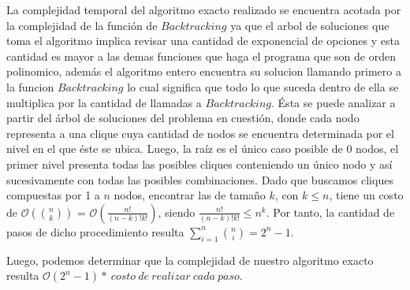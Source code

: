 La complejidad temporal del algoritmo exacto realizado se encuentra acotada por la complejidad de la función de $Backtracking$ ya que el arbol de soluciones que toma el algoritmo implica revisar una cantidad de exponencial de opciones y esta cantidad es mayor a las demas funciones que haga el programa que son de orden polinomico, además el algoritmo entero encuentra su solucion llamando primero a la funcion $Backtracking$ lo cual significa que todo lo que suceda dentro de ella se multiplica por la cantidad de llamadas a $Backtracking$. Ésta se puede analizar a partir del árbol de soluciones del problema en cuestión, donde cada nodo representa a una clique cuya cantidad de nodos se encuentra determinada por el nivel en el que éste se ubica. Luego, la raíz es el único caso posible de 0 nodos, el primer nivel presenta todas las posibles cliques conteniendo un único nodo y así sucesivamente con todas las posibles combinaciones. Dado que buscamos cliques compuestas por 1 a $n$ nodos, encontrar las de tamaño $k$, con $k\leq n$, tiene un costo de $\mathcal{O}({n \choose k})$ = $\mathcal{O}(\frac{n!}{(n-k)!k!})$, siendo $\frac{n!}{(n-k)!k!} \leq n^k$. Por tanto, la cantidad de pasos de dicho procedimiento resulta $\sum\limits_{i=1}^n {n \choose i} = 2^n - 1$. 

Luego, podemos determinar que la complejidad de nuestro algoritmo exacto resulta $\mathcal{O}(2^n - 1) * \ costo\ de\ realizar\ cada\ paso$.


